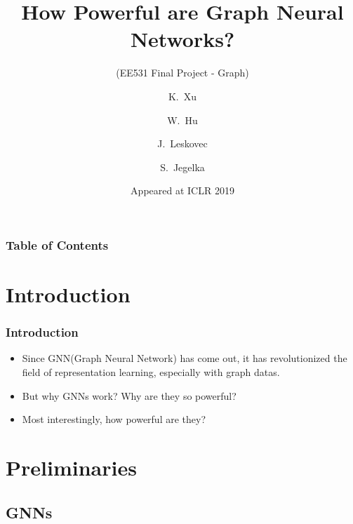 \documentclass{beamer}
\title[How Powerful are Graph Neural Networks?]
{How Powerful are Graph Neural Networks?}
\subtitle{(EE531 Final Project - Graph)}
\author[Junghyun Lee]
{K.~Xu\inst{1} \and W.~Hu\inst{2} \and J.~Leskovec\inst{2} \and S.~Jegelka\inst{1}}
\institute[KAIST]
{
	\inst{1}%
	MIT
	
	\inst{2}%
	Stanford University
}
\date[ICLR 2019]
{Appeared at ICLR 2019}
\begin{document}
\frame{\titlepage}


\begin{frame}
\frametitle{Table of Contents}
\tableofcontents
\end{frame}


\section{Introduction}

\begin{frame}
\frametitle{Introduction}

\begin{itemize}
    \item Since GNN(Graph Neural Network) has come out, it has revolutionized the field of representation learning, especially with graph datas. \pause
    \item But why GNNs work? Why are they so powerful? \pause
    \item Most interestingly, how powerful are they?
\end{itemize}
\end{frame}


\section{Preliminaries}


\subsection{GNNs}
\end{document}

